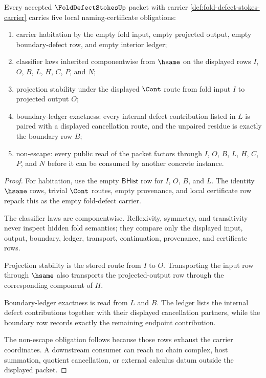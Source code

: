 \begin{theorem}
\label{thm:fold-defect-stokes-namecert-obligations}
Every accepted $\FoldDefectStokesUp$ packet with carrier \autoref{def:fold-defect-stokes-carrier} carries five local naming-certificate obligations:
\begin{enumerate}
\item carrier habitation by the empty fold input, empty projected output, empty boundary-defect row, and empty interior ledger;
\item classifier laws inherited componentwise from $\hsame$ on the displayed rows $I$, $O$, $B$, $L$, $H$, $C$, $P$, and $N$;
\item projection stability under the displayed $\Cont$ route from fold input $I$ to projected output $O$;
\item boundary-ledger exactness: every internal defect contribution listed in $L$ is paired with a displayed cancellation route, and the unpaired residue is exactly the boundary row $B$;
\item non-escape: every public read of the packet factors through $I$, $O$, $B$, $L$, $H$, $C$, $P$, and $N$ before it can be consumed by another concrete instance.
\end{enumerate}
\end{theorem}
\begin{proof}
For habitation, use the empty $\mathsf{BHist}$ row for $I$, $O$, $B$, and $L$. The identity $\hsame$ rows, trivial $\Cont$ routes, empty provenance, and local certificate row repack this as the empty fold-defect carrier.

The classifier laws are componentwise. Reflexivity, symmetry, and transitivity never inspect hidden fold semantics; they compare only the displayed input, output, boundary, ledger, transport, continuation, provenance, and certificate rows.

Projection stability is the stored route from $I$ to $O$. Transporting the input row through $\hsame$ also transports the projected-output row through the corresponding component of $H$.

Boundary-ledger exactness is read from $L$ and $B$. The ledger lists the internal defect contributions together with their displayed cancellation partners, while the boundary row records exactly the remaining endpoint contribution.

The non-escape obligation follows because those rows exhaust the carrier coordinates. A downstream consumer can reach no chain complex, host summation, quotient cancellation, or external calculus datum outside the displayed packet.
\end{proof}

